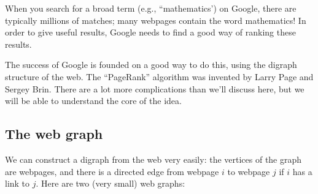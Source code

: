 \documentclass[11pt]{article}
\begin{document}



When you search for a broad term (e.g., ``mathematics') on Google, there are typically millions of matches; many webpages contain the word mathematics! In order to give useful results, Google needs to find a good way of ranking these results.

The success of Google is founded on a good way to do this, using the digraph structure of the web. The ``PageRank'' algorithm was invented by Larry Page and Sergey Brin. There are a lot more complications than we'll discuss here, but we will be able to understand the core of the idea.

\subsection*{The web graph}

We can construct a digraph from the web very easily: the vertices of the graph are webpages, and there is a directed edge from webpage $i$ to webpage $j$ if $i$ has a link to $j$. Here are two (very small) web graphs:

\begin{center}
\hspace{5cm}
\end{center}
\end{document}
